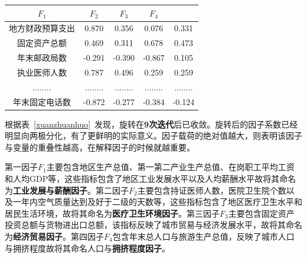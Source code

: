 \documentclass{whutmod}
\begin{document}
\begin{itemize}
\begin{table}[H]
\begin{tabular}{ccccc}
				\multicolumn{1}{m{1cm}}{\centering $F_{1}$} & \multicolumn{1}{m{1cm}}{\centering $F_{2}$} & \multicolumn{1}{m{1cm}}{\centering $F_{3}$}&
				\multicolumn{1}{m{1cm}}{\centering $F_{4}$}\\
				\midrule[1pt]
				地方财政预算支出&0.870	 & 0.356 & 0.076&0.331\\ 
				固定资产总额&0.469 & 0.311 &0.678&0.473\\ 
				年末邮政局数&-0.291 & -0.390  &-0.867&0.105\\ 
				执业医师人数&0.787 &0.496   &0.259 &0.259\\ 
				........& ........&  ........ &........ &........ \\ 
				年末固定电话数&-0.872 &-0.277   &-0.384 &-0.124 \\
				\bottomrule[2pt]
			\end{tabular}
		\end{table}
	
	根据表~\ref{xuanzhuanhuo}~发现，旋转在\textbf{9次迭代}后已收敛。旋转后的因子系数已经明显向两极分化，有了更鲜明的实际意义。因子载荷的绝对值越大，则表明该因子与变量的重叠性越高，在解释因子的时候就越重要。

		第一因子$F_{1}$主要包含地区生产总值、第一第二产业生产总值、在岗职工平均工资和人均GDP等，这些指标包含了地区工业发展水平以及人均薪酬水平故将其命名为\textbf{工业发展与薪酬因子}。第二因子$F_{2}$主要包含持证医师人数，医院卫生院个数以及一年内空气质量达到及好于二级的天数等，这些指标包含了地区医疗卫生水平和居民生活环境，故将其命名为\textbf{医疗卫生环境因子}。第三因子$F_{3}$主要包含固定资产投资总额与货物进出口总额，该指标反映了城市贸易与经济发展水平，故将其命名为\textbf{经济贸易因子}。第四因子$F_{4}$包含年末总人口与旅游生产总值，反映了城市人口与拥挤程度故将其命名人口与\textbf{拥挤程度因子}。


\end{itemize}
\end{document}
